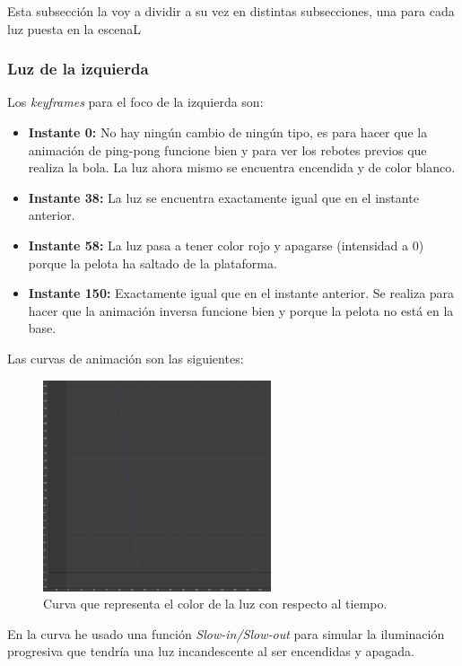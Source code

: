 \documentclass{article}
\begin{document}
Esta subsección la voy a dividir a su vez en distintas subsecciones, una para cada luz puesta en la escenaL

\subsubsection{Luz de la izquierda}

Los \textit{keyframes} para el foco de la izquierda son:

\begin{itemize}
    \item \textbf{Instante 0: }No hay ningún cambio de ningún tipo, es para hacer que la animación de ping-pong funcione bien y para ver los rebotes previos que realiza la bola. La luz ahora mismo se encuentra encendida y de color blanco.
    \item \textbf{Instante 38: }La luz se encuentra exactamente igual que en el instante anterior.
    \item \textbf{Instante 58: }La luz pasa a tener color rojo y apagarse (intensidad a 0) porque la pelota ha saltado de la plataforma.
    \item \textbf{Instante 150: }Exactamente igual que en el instante anterior. Se realiza para hacer que la animación inversa funcione bien y porque la pelota no está en la base.
\end{itemize}

Las curvas de animación son las siguientes:

\begin{figure}[H]
    \centering
    \includegraphics[width=0.6\textwidth]{imagenes/curvas/LL/filter.png}
    \caption{Curva que representa el color de la luz con respecto al tiempo.}
 \end{figure}

En la curva he usado una función \textit{Slow-in/Slow-out} para simular la iluminación progresiva que tendría una luz incandescente al ser encendidas y apagada.
\end{document}
